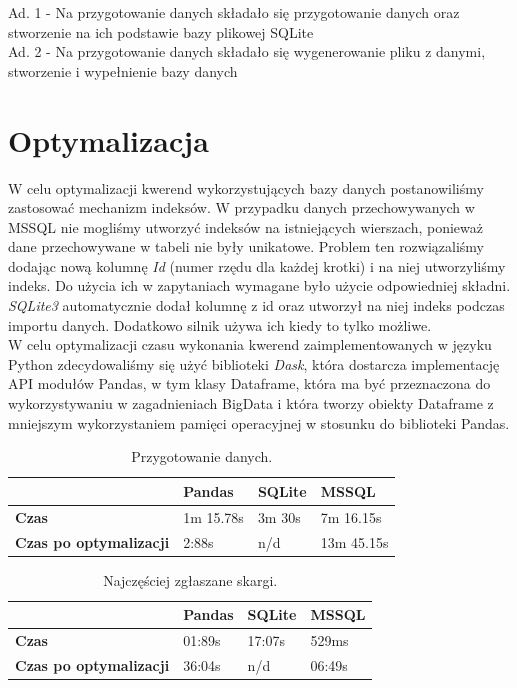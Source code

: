 \documentclass{classrep}
\begin{document}
Ad. 1 - Na przygotowanie danych składało się przygotowanie danych oraz stworzenie na ich podstawie bazy plikowej SQLite \\

Ad. 2  - Na przygotowanie danych składało się wygenerowanie pliku z danymi, stworzenie i wypełnienie bazy danych
\section{Optymalizacja}

W celu optymalizacji kwerend wykorzystujących bazy danych postanowiliśmy zastosować mechanizm indeksów. W przypadku danych przechowywanych w MSSQL nie mogliśmy utworzyć indeksów na istniejących wierszach, ponieważ dane przechowywane w tabeli nie były unikatowe. Problem ten rozwiązaliśmy dodając nową kolumnę \textit{Id} (numer rzędu dla każdej krotki) i na niej utworzyliśmy indeks. Do użycia ich w zapytaniach wymagane było użycie odpowiedniej składni. \textit{SQLite3} automatycznie dodał kolumnę z id oraz utworzył na niej indeks podczas importu danych. Dodatkowo silnik używa ich kiedy to tylko możliwe.\\

W celu optymalizacji czasu wykonania kwerend zaimplementowanych w języku Python zdecydowaliśmy się użyć biblioteki \textit{Dask}, która dostarcza implementację API modułów Pandas, w tym klasy Dataframe, która ma być przeznaczona do wykorzystywaniu w zagadnieniach BigData i która tworzy obiekty Dataframe z mniejszym wykorzystaniem pamięci operacyjnej w stosunku do biblioteki Pandas.


\begin{table}[H]
\centering
\caption{Przygotowanie danych.}
\label{tab:calc1}
\begin{tabular}{|l|l|l|l|}
\hline
 & \textbf{Pandas} & \textbf{SQLite} & \textbf{MSSQL} \\ \hline
\textbf{Czas} & 1m 15.78s & 3m 30s & 7m 16.15s \\ \hline
\textbf{Czas po optymalizacji} & 2:88s & n/d & 13m 45.15s \\ \hline
\end{tabular}
\end{table}

\begin{table}[H]
\centering
\caption{Najczęściej zgłaszane skargi.}
\label{tab:calc2}
\begin{tabular}{|l|l|l|l|}
\hline
 & \textbf{Pandas} & \textbf{SQLite} & \textbf{MSSQL} \\ \hline
\textbf{Czas} & 01:89s & 17:07s & 529ms \\ \hline
\textbf{Czas po optymalizacji} & 36:04s & n/d & 06:49s \\ \hline
\end{tabular}
\end{table}
\end{document}
